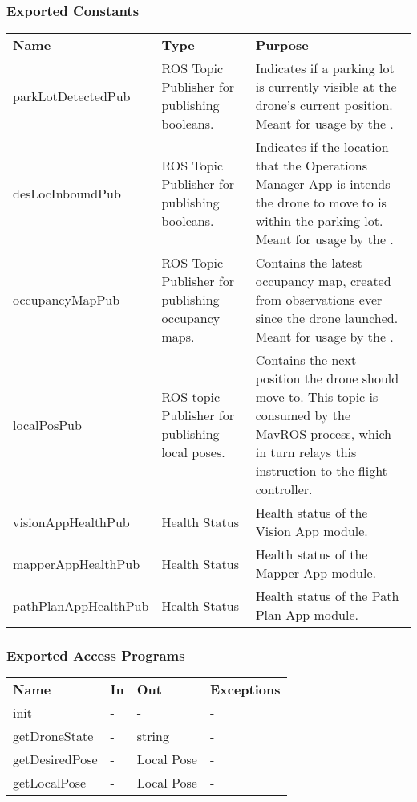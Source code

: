 \documentclass[12pt, titlepage]{article}
\begin{document}
\subsubsection{Exported Constants}
\begin{center}
\begin{tabular}{p{4cm} p{3cm} p{7.8cm}}
\hline
\textbf{Name} & \textbf{Type} & \textbf{Purpose} \\
parkLotDetectedPub & ROS Topic Publisher for publishing booleans. &  Indicates if a parking lot is currently visible at the drone's current position. Meant for usage by the \nameref{Operations Manager}. \\
desLocInboundPub & ROS Topic Publisher for publishing booleans. &  Indicates if the location that the Operations Manager App is intends the drone to move to is within the parking lot. Meant for usage by the \nameref{Operations Manager}. \\
occupancyMapPub  & ROS Topic Publisher for publishing occupancy maps. &  Contains the latest occupancy map, created from observations ever since the drone launched. Meant for usage by the \nameref{Operations Manager}. \\
localPosPub & ROS topic Publisher for publishing local poses. &  Contains the next position the drone should move to. This topic is consumed by the MavROS process, which in turn relays this instruction to the flight controller. \\
visionAppHealthPub & Health Status & Health status of the Vision App module.  \\
mapperAppHealthPub & Health Status & Health status of the Mapper App module.  \\
pathPlanAppHealthPub & Health Status & Health status of the Path Plan App module.  \\
\hline
\hline
\end{tabular}
\end{center}
\subsubsection{Exported Access Programs}
\begin{center}
\begin{tabular}{p{3.5cm} p{2.5cm} p{2.5cm} p{5cm}}
\hline
\textbf{Name} & \textbf{In} & \textbf{Out} & \textbf{Exceptions} \\
init &  - & - & - \\
getDroneState &  - & string & - \\
getDesiredPose & - & Local Pose & - \\
getLocalPose & - & Local Pose & - \\
\hline
\hline
\end{tabular}
\end{center}
\end{document}

